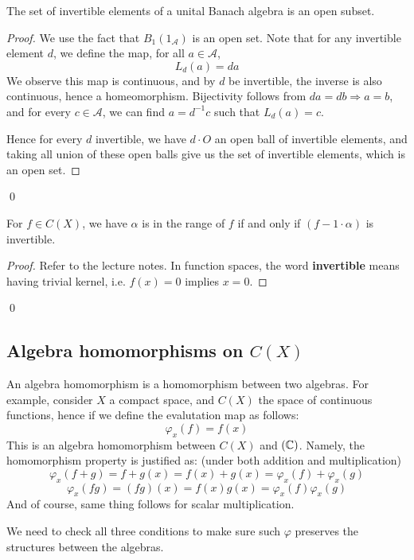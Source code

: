 \begin{proposition}
    The set of invertible elements of a unital Banach algebra is an open subset.
\end{proposition}
\begin{proof}
    We use the fact that $B_1(1_\mathcal{A})$ is an open set. Note that for any invertible element $d$, we define the map, for all $a\in\mathcal{A}$,
    \begin{equation*}
        L_d(a)=da
    \end{equation*}
    We observe this map is continuous, and by $d$ be invertible, the inverse is also continuous, hence a homeomorphism. Bijectivity follows from $da=db\Rightarrow a=b$, and for every $c\in\mathcal{A}$, we can find $a=d^{-1}c$ such that $L_d(a)=c$.

    Hence for every $d$ invertible, we have $d\cdot O$ an open ball of invertible elements, and taking all union of these open balls give us the set of invertible elements, which is an open set.
\end{proof}
\qed

\begin{proposition}
    For $f\in C(X)$, we have $\alpha$ is in the range of $f$ if and only if $(f-1\cdot\alpha)$ is invertible.
\end{proposition}
\begin{proof}
    Refer to the lecture notes. In function spaces, the word \textbf{invertible} means having trivial kernel, i.e. $f(x)=0$ implies $x=0$.
\end{proof}
\qed


\subsection{Algebra homomorphisms on $C(X)$}
\begin{definition}
    An algebra homomorphism is a homomorphism between two algebras. For example, consider $X$ a compact space, and $C(X)$ the space of continuous functions, hence if we define the evalutation map as follows:
    \begin{equation*}
        \varphi_x(f)=f(x)
    \end{equation*}
    This is an algebra homomorphism between $C(X)$ and $(\mathbb{C})$. Namely, the homomorphism property is justified as: (under both addition and multiplication)
    \begin{equation*}
        \varphi_x(f+g)=f+g(x)=f(x)+g(x)=\varphi_x(f)+\varphi_x(g)
    \end{equation*}
    \begin{equation*}
        \varphi_x(fg)=(fg)(x)=f(x)g(x)=\varphi_x(f)\varphi_x(g)
    \end{equation*}
    And of course, same thing follows for scalar multiplication. 
\end{definition}
\begin{remark}
    We need to check all three conditions to make sure such $\varphi$ preserves the structures between the algebras.
\end{remark}

